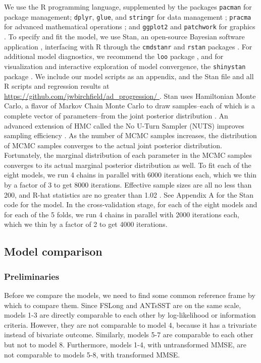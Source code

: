 \documentclass[12pt]{article}
\begin{document}
We use the R programming language, supplemented by the packages \texttt{pacman} for package management; \texttt{dplyr}, \texttt{glue}, and \texttt{stringr} for data management \citep{dplyr, stringr}; \texttt{pracma} for advanced mathematical operations \citep{pracma}; and \texttt{ggplot2} and \texttt{patchwork} for graphics \citep{ggplot2, patchwork}. To specify and fit the model, we use Stan, an open-source Bayesian software application \citep{carpenter2017stan}, interfacing with R through the \texttt{cmdstanr} and \texttt{rstan} packages \citep{rstan}. For additional model diagnostics, we recommend the \texttt{loo} package \citep{vehtari2017practical, loo}, and for visualization and interactive exploration of model convergence, the \texttt{shinystan} package \citep{muth2018user}. We include our model scripts as an appendix, and the Stan file and all R scripts and regression results at \url{ https://github.com/jwbirchfield/ad\_progression/ }. Stan uses Hamiltonian Monte Carlo, a flavor of Markov Chain Monte Carlo to draw samples--each of which is a complete vector of parameters--from the joint posterior distribution \citep{neal2011mcmc}. An advanced extension of HMC called the No U-Turn Sampler (NUTS) improves sampling efficiency \citep{hoffman2014no}. As the number of MCMC samples increases, the distribution of MCMC samples converges to the actual joint posterior distribution. Fortunately, the marginal distribution of each parameter in the MCMC samples converges to its actual marginal posterior distribution as well. To fit each of the eight models, we run 4 chains in parallel with 6000 iterations each, which we thin by a factor of 3 to get 8000 iterations. Effective sample sizes are all no less than 200, and R-hat statistics are no greater than 1.02 \citep{gelman1995bayesian}. See Appendix A for the Stan code for the model. In the cross-validation stage, for each of the eight models and for each of the 5 folds, we run 4 chains in parallel with 2000 iterations each, which we thin by a factor of 2 to get 4000 iterations. 

\pagebreak
\subsection{Model comparison}

\subsubsection{Preliminaries}

Before we compare the models, we need to find some common reference frame by which to compare them. Since FSLong and ANTsSST are on the same scale, models 1-3 are directly comparable to each other by log-likelihood or information criteria. However, they are not comparable to model 4, because it has a trivariate instead of bivariate outcome. Similarly, models 5-7 are comparable to each other but not to model 8. Furthermore, models 1-4, with untransformed MMSE, are not comparable to models 5-8, with transformed MMSE. 
\end{document}
